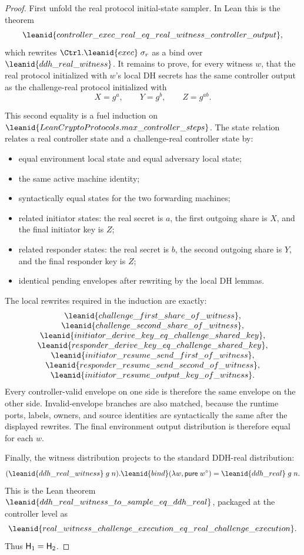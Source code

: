 \begin{proof}
First unfold the real protocol initial-state sampler.  In Lean this is the
theorem
\[
  \leanid{controller\_exec\_real\_eq\_real\_witness\_controller\_output},
\]
which rewrites \(\Ctrl.\leanid{exec}\;\sigma_r\) as a bind over
\(\leanid{ddh\_real\_witness}\).  It remains to prove, for every witness \(w\),
that the real protocol initialized with \(w\)'s local DH secrets has the same
controller output as the challenge-real protocol initialized with
\[
  X=g^a,\qquad Y=g^b,\qquad Z=g^{ab}.
\]

This second equality is a fuel induction on
\(\leanid{LeanCryptoProtocols.max\_controller\_steps}\).  The state relation
relates a real controller state and a challenge-real controller state by:
\begin{itemize}
\item equal environment local state and equal adversary local state;
\item the same active machine identity;
\item syntactically equal states for the two forwarding machines;
\item related initiator states: the real secret is \(a\), the first outgoing
share is \(X\), and the final initiator key is \(Z\);
\item related responder states: the real secret is \(b\), the second outgoing
share is \(Y\), and the final responder key is \(Z\);
\item identical pending envelopes after rewriting by the local DH lemmas.
\end{itemize}
The local rewrites required in the induction are exactly:
\[
\begin{array}{c}
\leanid{challenge\_first\_share\_of\_witness},\\
\leanid{challenge\_second\_share\_of\_witness},\\
\leanid{initiator\_derive\_key\_eq\_challenge\_shared\_key},\\
\leanid{responder\_derive\_key\_eq\_challenge\_shared\_key},\\
\leanid{initiator\_resume\_send\_first\_of\_witness},\\
\leanid{responder\_resume\_send\_second\_of\_witness},\\
\leanid{initiator\_resume\_output\_key\_of\_witness}.
\end{array}
\]
Every controller-valid envelope on one side is therefore the same envelope on
the other side.  Invalid-envelope branches are also matched, because the
runtime ports, labels, owners, and source identities are syntactically the same
after the displayed rewrites.  The final environment output distribution is
therefore equal for each \(w\).

Finally, the witness distribution projects to the standard DDH-real
distribution:
\[
  (\leanid{ddh\_real\_witness}\;g\;n).\leanid{bind}
    (\lambda w,\mathsf{pure}\;w^\circ)
  =
  \leanid{ddh\_real}\;g\;n .
\]
This is the Lean theorem
\(\leanid{ddh\_real\_witness\_to\_sample\_eq\_ddh\_real}\), packaged at the
controller level as
\[
  \leanid{real\_witness\_challenge\_execution\_eq\_real\_challenge\_execution}.
\]
Thus \(\mathsf{H}_1=\mathsf{H}_2\).
\end{proof}

